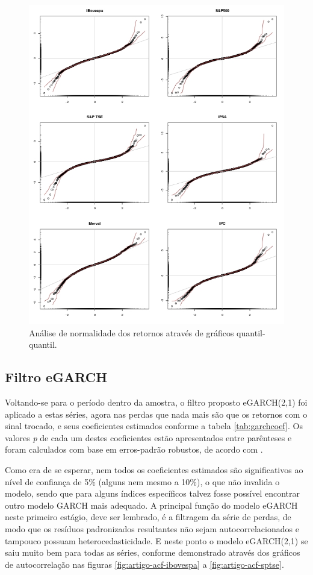 \documentclass[review]{elsarticle}
\theoremstyle{definition}
\begin{document}
\begin{figure}[H]
	\centering
	\includegraphics[width=1\linewidth]{figs/artigo-qqplots}
	\caption{Análise de normalidade dos retornos através de gráficos quantil-quantil.}
	\label{fig:artigo-qqplots}
\end{figure}

\subsection{Filtro eGARCH}
\label{sec:filtro}

Voltando-se para o período dentro da amostra, o filtro proposto eGARCH(2,1) foi aplicado a estas séries, agora nas perdas que nada mais são que os retornos com o sinal trocado, e seus coeficientes estimados conforme a tabela \ref{tab:garchcoef}. Os valores \emph{p} de cada um destes coeficientes estão apresentados entre parênteses e foram calculados com base em erros-padrão robustos, de acordo com \cite{White1982}.

Como era de se esperar, nem todos os coeficientes estimados são significativos ao nível de confiança de 5\% (alguns nem mesmo a 10\%), o que não invalida o modelo, sendo que para alguns índices específicos talvez fosse possível encontrar outro modelo GARCH mais adequado. A principal função do modelo eGARCH neste primeiro estágio, deve ser lembrado, é a filtragem da série de perdas, de modo que os resíduos padronizados resultantes não sejam autocorrelacionados e tampouco possuam heterocedasticidade. E neste ponto o modelo eGARCH(2,1) se saiu muito bem para todas as séries, conforme demonstrado através dos gráficos de autocorrelação nas figuras \ref{fig:artigo-acf-ibovespa} a \ref{fig:artigo-acf-sptse}.
\end{document}
